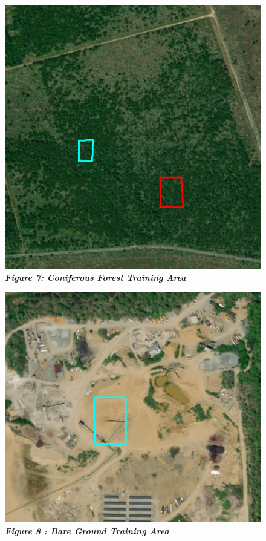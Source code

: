 \documentclass[]{article}
\begin{document}
\begin{figure}
\centering
\includegraphics{images/CF_TA.png}
\caption{\textbf{\emph{Figure 7: Coniferous Forest Training Area}}}
\end{figure}

\begin{figure}
\centering
\includegraphics{images/BG_TA.png}
\caption{\textbf{\emph{Figure 8 : Bare Ground Training Area}}}
\end{figure}
\end{document}
